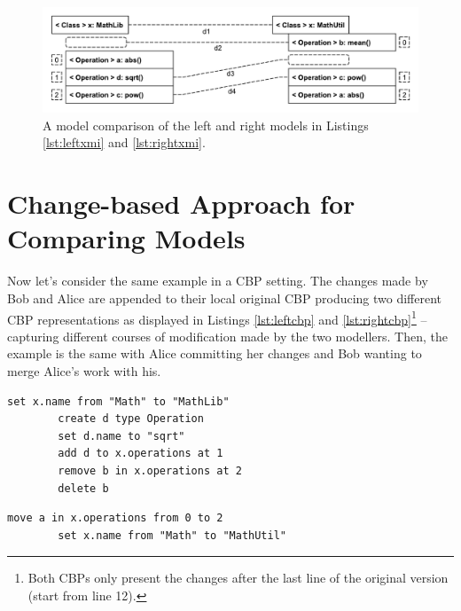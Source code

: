 \documentclass{jot}
\begin{document}
    \begin{figure}
        \includegraphics[width=\linewidth]{XmiComparison}
        \caption{A model comparison of the left and right models in Listings \ref{lst:leftxmi} and \ref{lst:rightxmi}.}
        \label{fig:xmi_comparison}
    \end{figure}
    
    \section{Change-based Approach for Comparing Models}
    \label{sec:change_based_approach_for_comparing_models}
    
    Now let's consider the same example in a CBP setting.
    The changes made by Bob and Alice are appended to their local original CBP producing two different CBP representations as displayed in Listings \ref{lst:leftcbp} and \ref{lst:rightcbp}\footnote{Both CBPs only present the changes after the last line of the original version (start from line 12).} -- capturing different courses of modification made by the two modellers.
    Then, the example is the same with Alice committing her changes and Bob wanting to merge Alice's work with his. 
    
    
    \begin{minipage}[t]{0.49\linewidth}    
        \begin{lstlisting}[firstnumber=12,style=eol,caption={The appended changes made by Bob to produce the model in Fig. \ref{fig:left} (left version).},label=lst:leftcbp]
        set x.name from "Math" to "MathLib"
        create d type Operation
        set d.name to "sqrt"
        add d to x.operations at 1
        remove b in x.operations at 2
        delete b
        \end{lstlisting}
    \end{minipage}
    \hfill
    \begin{minipage}[t]{0.49\linewidth}
        \begin{lstlisting}[firstnumber=12,style=eol,caption={The appended changes made by Alice to produce the model in Fig. \ref{fig:right} (right version).},label=lst:rightcbp]
        move a in x.operations from 0 to 2
        set x.name from "Math" to "MathUtil"
        \end{lstlisting}
    \end{minipage}
    
\end{document}
